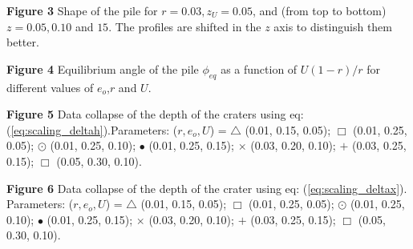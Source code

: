 {\bf Figure 3} Shape of the pile for $r=0.03,z_U=0.05$, and (from top
to bottom) $z=0.05,0.10$ and $15$. The profiles are shifted in the $z$ axis
to distinguish them better.

{\bf Figure 4} Equilibrium angle of the pile $\phi_{eq}$ as a function
of $U(1-r)/r$ for different values of $e_o$,$r$ and $U$.

{\bf Figure 5} Data collapse of the depth of the craters using eq: 
(\ref{eq:scaling_deltah}).Parameters: ($r,e_o,U$) = 
$\triangle$ (0.01, 0.15, 0.05); 
$\Box$ (0.01, 0.25, 0.05); 
$\odot$ (0.01, 0.25, 0.10); 
$\bullet$ (0.01, 0.25, 0.15); 
$\times$ (0.03, 0.20, 0.10); 
$+$ (0.03, 0.25, 0.15); 
$\Box$ (0.05, 0.30, 0.10).

{\bf Figure 6} Data collapse of the depth of the crater using eq: (\ref{eq:scaling_deltax}). 
Parameters: ($r,e_o,U$) = 
$\triangle$ (0.01, 0.15, 0.05); 
$\Box$ (0.01, 0.25, 0.05); 
$\odot$ (0.01, 0.25, 0.10); 
$\bullet$ (0.01, 0.25, 0.15); 
$\times$ (0.03, 0.20, 0.10); 
$+$ (0.03, 0.25, 0.15); 
$\Box$ (0.05, 0.30, 0.10).





